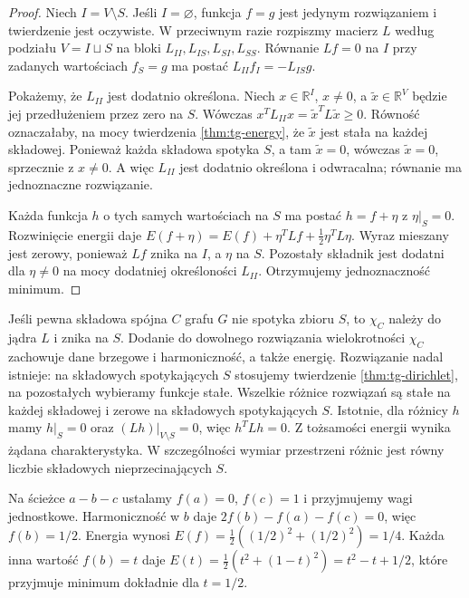 \begin{proof}
Niech $I=V\setminus S$. Jeśli $I=\varnothing$, funkcja $f=g$
jest jedynym rozwiązaniem i twierdzenie jest oczywiste.
W przeciwnym razie rozpiszmy macierz $L$ według podziału
$V=I\sqcup S$ na bloki $L_{II},L_{IS},L_{SI},L_{SS}$.
Równanie $Lf=0$ na $I$ przy zadanych wartościach
$f_S=g$ ma postać $L_{II}f_I=-L_{IS}g$.

Pokażemy, że $L_{II}$ jest dodatnio określona. Niech
$x\in\mathbb R^I$, $x\ne0$, a $\widetilde x\in\mathbb R^V$
będzie jej przedłużeniem przez zero na $S$.
Wówczas $x^TL_{II}x=\widetilde x^TL\widetilde x\ge0$.
Równość oznaczałaby, na mocy twierdzenia
\ref{thm:tg-energy}, że $\widetilde x$ jest stała
na każdej składowej. Ponieważ każda składowa spotyka $S$,
a tam $\widetilde x=0$, wówczas $\widetilde x=0$,
sprzecznie z $x\ne0$. A więc $L_{II}$ jest dodatnio
określona i odwracalna; równanie ma jednoznaczne rozwiązanie.

Każda funkcja $h$ o tych samych wartościach na $S$
ma postać $h=f+\eta$ z $\eta|_S=0$.
Rozwinięcie energii daje
$E(f+\eta)=E(f)+\eta^TLf+\tfrac12\eta^TL\eta$.
Wyraz mieszany jest zerowy, ponieważ $Lf$ znika na
$I$, a $\eta$ na $S$. Pozostały składnik jest dodatni
dla $\eta\ne0$ na mocy dodatniej określoności $L_{II}$.
Otrzymujemy jednoznaczność minimum.
\end{proof}

\begin{uwaga}
Jeśli pewna składowa spójna $C$ grafu $G$ nie spotyka
zbioru $S$, to $\chi_C$ należy do jądra $L$ i znika na $S$.
Dodanie do dowolnego rozwiązania wielokrotności
$\chi_C$ zachowuje dane brzegowe i harmoniczność,
a także energię. Rozwiązanie nadal istnieje: na
składowych spotykających $S$ stosujemy twierdzenie
\ref{thm:tg-dirichlet}, na pozostałych wybieramy funkcje
stałe. Wszelkie różnice rozwiązań są stałe na każdej
składowej i zerowe na składowych spotykających $S$.
Istotnie, dla różnicy $h$ mamy $h|_S=0$ oraz
$(Lh)|_{V\setminus S}=0$, więc $h^TLh=0$.
Z tożsamości energii wynika żądana charakterystyka.
W szczególności wymiar przestrzeni różnic jest równy
liczbie składowych nieprzecinających $S$.
\end{uwaga}

\begin{przyklad}
Na ścieżce $a-b-c$ ustalamy $f(a)=0$, $f(c)=1$
i przyjmujemy wagi jednostkowe. Harmoniczność w $b$ daje
$2f(b)-f(a)-f(c)=0$, więc $f(b)=1/2$.
Energia wynosi $E(f)=\tfrac12((1/2)^2+(1/2)^2)=1/4$.
Każda inna wartość $f(b)=t$ daje
$E(t)=\tfrac12(t^2+(1-t)^2)=t^2-t+1/2$,
które przyjmuje minimum dokładnie dla $t=1/2$.
\end{przyklad}

